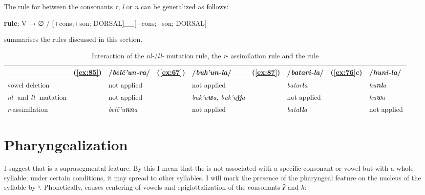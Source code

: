 \documentclass[output=paper]{langsci/langscibook}
\begin{document}
The rule for  between the consonants \emph{r}, \emph{l} or
\emph{n} can be generalized as follows:


\medskip
\centerline{\textbf{ rule}: V → ∅ / [+cons;+son;
DORSAL]\_\_[+cons;+son; \mbox{DORSAL}]}


\pagebreak
\medskip
{} summarises the rules discussed in this section.

\begin{table}
  \caption{Interaction of the \emph{nl-}/\emph{ll-} mutation rule, the \emph{r}-
assimilation rule and the  rule}\label{t3-5}

\small
\advance\tabcolsep-2pt
\begin{tabular}{@{}m{6em}<{\raggedright}l@{ }ll@{ }m{5em}<{\raggedright}l@{ }ll@{ }l@{}}
\toprule
& (\ref{ex:85}) & /\emph{belč'u\textbf{n-r}a}/ & (\ref{ex:67}) &
/\emph{buk'u\textbf{n-l}a}/ & (\ref{ex:87}) & /\emph{batari-\textbf{l}a}/ & (\ref{ex:76}c)
& /\emph{hu\textbf{ni-l}a}/\tabularnewline  \midrule
vowel deletion & & not applied & & not applied & &
\emph{batar\textbf{l}a} & & \emph{hu\textbf{nl}a}\tabularnewline  
\emph{nl}- and \emph{ll}- mutation &  & not applied  &  & \emph{buk'u\textbf{w}a, buk'u\textbf{jj}a} &  & not applied &  & 
\emph{hu\textbf{w}a}\tabularnewline 
\emph{r}-assimilation & & \emph{belč'u\textbf{nn}a} & & not applied & &
\emph{bata\textbf{ll}a} & & not applied\tabularnewline
\bottomrule
\end{tabular}
\end{table}



\section{Pharyngealization}\label{pharyngealization}

I suggest that  is a suprasegmental feature. By this I
mean that the  is not associated with a specific
consonant or vowel but with a whole syllable; under certain conditions,
it may spread to other syllables. I will mark the presence of the
pharyngeal feature on the nucleus of the syllable by \emph{ˤ}.
Phonetically,  causes centering of vowels and
epiglottalization of the consonants \emph{ʔ} and \emph{ħ}:
\end{document}
